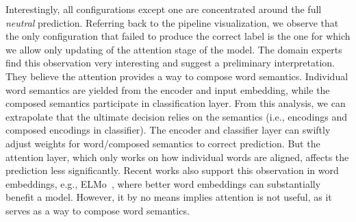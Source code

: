Interestingly, all configurations except one are concentrated around the full \emph{neutral} prediction. Referring back to the pipeline visualization, we observe that the only configuration that failed to produce the correct label is the one for which we allow only updating of the attention stage of the model.
%
%
The domain experts find this observation very interesting and suggest a preliminary interpretation. They believe the attention provides a way to compose word semantics. Individual word semantics are yielded from the encoder and input embedding, while the composed semantics participate in classification layer. From this analysis, we can extrapolate that the ultimate decision relies on the semantics (i.e., encodings and composed encodings in classifier). The encoder and classifier layer can swiftly adjust weights for word/composed semantics to correct prediction. But the attention layer, which only works on how individual words are aligned, affects the prediction less significantly. Recent works also support this observation in word embeddings, e.g., ELMo~\cite{salant2017contextualized}, where better word embeddings can substantially benefit a model. However, it by no means implies attention is not useful, as it serves as a way to compose word semantics.
